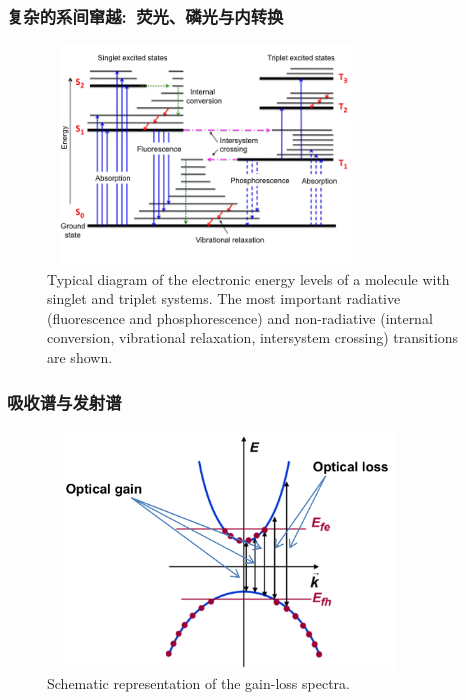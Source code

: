 {\frame
{
	\frametitle{复杂的系间窜越:~荧光、磷光与内转换}
\begin{figure}[h!]
\centering
\vspace*{-0.05in}
\includegraphics[height=2.3in,width=3.3in,viewport=0 0 720 520,clip]{Figures/Typical-diagram-of-the-electronic-energy-levels-of-a-molecule-with-singlet-and-triplet.png}
\caption{\fontsize{5.2pt}{4.0pt}\selectfont\textrm{Typical diagram of the electronic energy levels of a molecule with singlet and triplet  systems. The most important radiative (fluorescence and phosphorescence) and non-radiative (internal conversion, vibrational relaxation, intersystem crossing) transitions are shown.}}%
\label{singlet-triplet}
\end{figure} 
}

\frame
{
	\frametitle{吸收谱与发射谱}
\begin{figure}[h!]
\centering
\vspace*{-0.19in}
\includegraphics[height=2.5in,width=3.80in,viewport=0 0 950 700,clip]{Figures/Optical_gain-loss.png}
\caption{\fontsize{5.2pt}{4.0pt}\selectfont\textrm{Schematic representation of the gain-loss spectra.}}%
\label{gain-loss_Bandgap}
\end{figure} 
}

}
